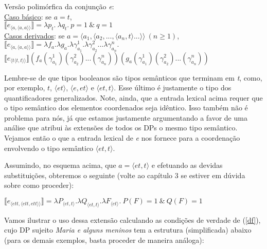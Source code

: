 \begin{exe}
	\ex Versão polimórfica da conjun\-ção \textit{e}: \\
	\hspace*{18pt}\underline{Caso básico}: se $a = t$, \\
	\hspace*{30pt}$\llbracket e_{\langle a ,\langle a,a\rangle\rangle}\rrbracket = \lambda p_{t}.\ \lambda q_{t}.\ p=1\ \&\ q=1$ \\ 
	\hspace*{18pt}\underline{Casos derivados}: se $a = \langle a_{1},\langle a_{2}, ... ,\langle a_{n},t\rangle ... \rangle\rangle\ (n\geq 1)$, \\
	\hspace*{30pt} $\llbracket e_{\langle a ,\langle a,a\rangle\rangle}\rrbracket = \lambda f_{a}.\lambda g_{a}.\lambda \gamma_{a_{1}}^{1}.\lambda \gamma_{a_{2}}^{2}...\lambda \gamma_{a_{n}}^{n}.$\\ \hspace*{\fill} $\llbracket e_{\langle t\langle t,t\rangle\rangle}\rrbracket(f_{a}(\gamma_{a_{1}}^{1})(\gamma_{a_{2}}^{2})...(\gamma_{a_{n}}^{n}))(g_{a}(\gamma_{a_{1}}^{1})(\gamma_{a_{2}}^{2})...(\gamma_{a_{n}}^{n}))$
\end{exe}

\n Lembre-se de que tipos booleanos são tipos semânticos que
terminam em \textit{t}, como, por exemplo, $t$, $\langle
et\rangle$, $\langle e,et\rangle$ e $\langle
et,t\rangle$. Esse último é justamente o tipo dos quantificadores
generalizados. Note, ainda, que a entrada lexical acima requer que o
tipo semântico dos elementos coordenados seja idêntico. Isso
também não é problema para nós, já que estamos justamente
argumentando a favor de uma análise que atribui às extensões de
todos os DPs o mesmo tipo semântico. Vejamos então o que a entrada
lexical de \textit{e} nos fornece para a coordenação envolvendo o
tipo semântico $\langle et,t\rangle$.

Assumindo, no esquema acima, que $a = \langle et,t\rangle$ e
efetuando as devidas substituições, obteremos o seguinte
(volte ao capítulo 3 se estiver em dúvida sobre como proceder):

\begin{exe}
	\ex $\llbracket e_{\langle ett ,\langle ett,ett\rangle\rangle}\rrbracket = \lambda P_{\langle et,t\rangle}.\lambda Q_{\langle et,t\rangle}.\lambda F_{\langle et\rangle}.\ P(F) = 1\ \&\ Q(F) = 1$
\end{exe}

\n Vamos ilustrar o uso dessa extensão calculando as condições de
verdade de (\ref{df}), cujo DP sujeito \textit{Maria e alguns
meninos} tem a estrutura (simplificada) abaixo (para os demais
exemplos, basta proceder de maneira análoga):

